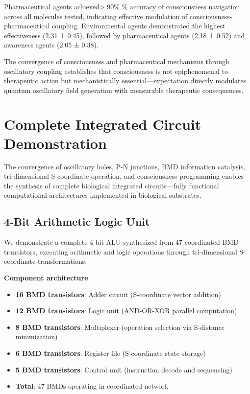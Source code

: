 \documentclass{article}
\theoremstyle{definition}
\theoremstyle{remark}
\begin{document}
Pharmaceutical agents achieved> 90\% \% accuracy of consciousness navigation across all molecules tested, indicating effective modulation of consciousness-pharmaceutical coupling. Environmental agents demonstrated the highest effectiveness (2.31 ± 0.45), followed by pharmaceutical agents (2.18 ± 0.52) and awareness agents (2.05 ± 0.38).

The convergence of consciousness and pharmaceutical mechanisms through oscillatory coupling establishes that consciousness is not epiphenomenal to therapeutic action but mechanistically essential—expectation directly modulates quantum oscillatory field generation with measurable therapeutic consequences.

\section{Complete Integrated Circuit Demonstration}

The convergence of oscillatory holes, P-N junctions, BMD information catalysis, tri-dimensional S-coordinate operation, and consciousness programming enables the synthesis of complete biological integrated circuits—fully functional computational architectures implemented in biological substrates.

\subsection{4-Bit Arithmetic Logic Unit}

We demonstrate a complete 4-bit ALU synthesized from 47 coordinated BMD transistors, executing arithmetic and logic operations through tri-dimensional S-coordinate transformations.

\textbf{Component architecture}:
\begin{itemize}
\item \textbf{16 BMD transistors}: Adder circuit (S-coordinate vector addition)
\item \textbf{12 BMD transistors}: Logic unit (AND-OR-XOR parallel computation)
\item \textbf{8 BMD transistors}: Multiplexer (operation selection via S-distance minimization)
\item \textbf{6 BMD transistors}: Register file (S-coordinate state storage)
\item \textbf{5 BMD transistors}: Control unit (instruction decode and sequencing)
\item \textbf{Total}: 47 BMDs operating in coordinated network
\end{itemize}
\end{document}
